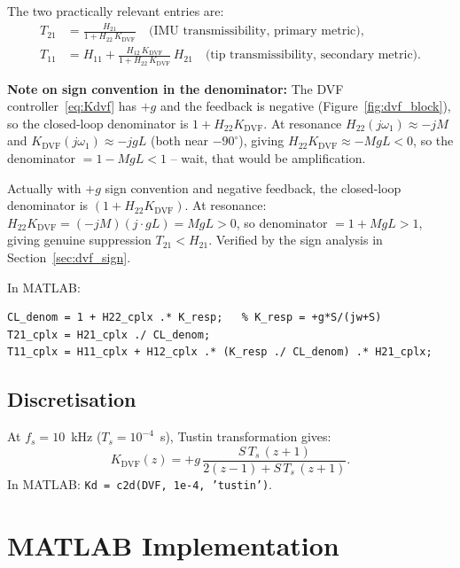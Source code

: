 \documentclass[12pt,a4paper]{article}
\begin{document}
The two practically relevant entries are:
\begin{align}
  T_{21} &= \frac{H_{21}}{1 + H_{22}\,K_\text{DVF}}
             \quad \text{(IMU transmissibility, primary metric)},
  \label{eq:T21} \\
  T_{11} &= H_{11} + \frac{H_{12}\,K_\text{DVF}}{1 + H_{22}\,K_\text{DVF}}\,H_{21}
             \quad \text{(tip transmissibility, secondary metric)}.
  \label{eq:T11}
\end{align}

\textbf{Note on sign convention in the denominator:}
The DVF controller~\eqref{eq:Kdvf} has $+g$ and the feedback is negative
(Figure~\ref{fig:dvf_block}), so the closed-loop denominator is
$1 + H_{22} K_\text{DVF}$.  At resonance
$H_{22}(j\omega_1) \approx -jM$ and $K_\text{DVF}(j\omega_1) \approx -jgL$
(both near $-90^\circ$), giving $H_{22} K_\text{DVF} \approx -MgL < 0$, so the
denominator $= 1 - MgL < 1$ -- wait, that would be amplification.

Actually with $+g$ sign convention and negative feedback, the closed-loop
denominator is $(1 + H_{22} K_\text{DVF})$.  At resonance:
$H_{22}K_\text{DVF} = (-jM)(j \cdot gL) = MgL > 0$, so denominator $= 1 + MgL > 1$,
giving genuine suppression $T_{21} < H_{21}$. Verified by the sign analysis in
Section~\ref{sec:dvf_sign}.

In MATLAB:
\begin{verbatim}
CL_denom = 1 + H22_cplx .* K_resp;   % K_resp = +g*S/(jw+S)
T21_cplx = H21_cplx ./ CL_denom;
T11_cplx = H11_cplx + H12_cplx .* (K_resp ./ CL_denom) .* H21_cplx;
\end{verbatim}

\subsection{Discretisation}
\label{sec:dvf_disc}

At $f_s = 10$~kHz ($T_s = 10^{-4}$~s), Tustin transformation gives:
\begin{equation}
  K_\text{DVF}(z) = +g\,\frac{S\,T_s\,(z+1)}{2(z-1) + S\,T_s\,(z+1)}.
\end{equation}
In MATLAB: \texttt{Kd = c2d(DVF, 1e-4, 'tustin')}.

\section{MATLAB Implementation}
\label{sec:matlab}
\end{document}
